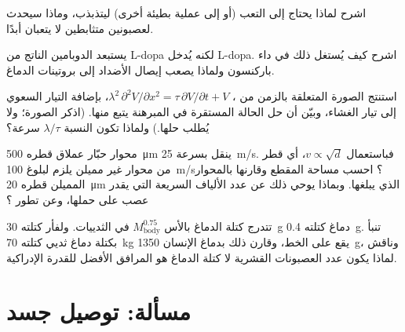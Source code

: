 \begin{exercise}[$\star\star$]\label{exo:b3:nervous-systems:8}
اشرح لماذا يحتاج  إلى التعب (أو إلى عملية
بطيئة أخرى) ليتذبذب، وماذا سيحدث لعصبونين متثابطين لا
يتعبان أبدًا.
\end{exercise}

\begin{exercise}[$\star\star$]\label{exo:b3:nervous-systems:9}
يستبعد  الدوبامين الناتج من L-dopa
لكنه يُدخل L-dopa. اشرح كيف يُستغل ذلك في داء باركنسون
ولماذا يصعب إيصال الأضداد إلى بروتينات الدماغ.
\end{exercise}

\begin{exercise}[$\star\star\star$]\label{exo:b3:nervous-systems:10}
استنتج الصورة المتعلقة بالزمن من ، $\lambda^{2}\,\partial^{2}
V/\partial x^{2} = \tau\,\partial V/\partial t + V$، بإضافة
التيار السعوي إلى تيار الغشاء، وبيّن أن حل الحالة المستقرة
في المبرهنة يتبع منها. (اذكر الصورة؛ ولا يُطلب حلها.)
ولماذا تكون النسبة $\lambda/\tau$ سرعة؟
\end{exercise}

\begin{exercise}[$\star\star\star$]\label{exo:b3:nervous-systems:11}
محوار حبّار عملاق قطره \qty{500}{\micro m} ينقل بسرعة \qty{25}{m/s}.
فباستعمال $v \propto \sqrt{d}$، أي قطر من محوار غير مميلن
يلزم لبلوغ \qty{100}{m/s}؟ احسب مساحة المقطع وقارنها بالمحوار
المميلن قطره \qty{20}{\micro m} الذي يبلغها. وبماذا يوحي ذلك
عن عدد الألياف السريعة التي يقدر عصب على حملها، وعن تطور
؟
\end{exercise}

\begin{exercise}[$\star\star\star$]\label{exo:b3:nervous-systems:12}
تتدرج كتلة الدماغ بالأس $M_{\text{body}}^{0.75}$ في
الثدييات. ولفأر كتلته \qty{30}{g} دماغ كتلته \qty{0.4}{g}.
تنبأ بكتلة دماغ ثديي كتلته \qty{70}{kg} يقع على الخط، وقارن
ذلك بدماغ الإنسان \qty{1350}{g}، وناقش لماذا يكون عدد
العصبونات القشرية لا كتلة الدماغ هو المرافق الأفضل للقدرة
الإدراكية.
\end{exercise}

\section{مسألة: توصيل جسد}

